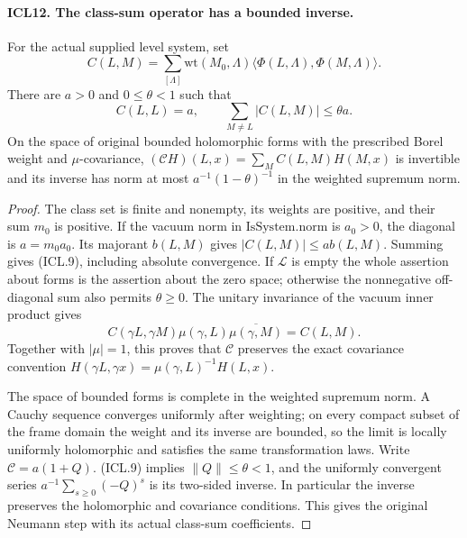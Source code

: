 \documentclass[11pt,a4paper]{article}
\numberwithin{equation}{section}
\theoremstyle{remark}\newtheorem{remark}[theorem]{Remark}
\begin{document}
\paragraph{ICL12. The class-sum operator has a bounded inverse.}
\label{claim:ICL12}
For the actual supplied level system, set
\[
 C(L,M)=\sum_{[\Lambda]}\mathrm{wt}(M_0,\Lambda)
       \langle\Phi(L,\Lambda),\Phi(M,\Lambda)\rangle.
                                                               \tag{ICL.8}
\]
There are \(a>0\) and \(0\leq\theta<1\) such that
\[
 C(L,L)=a,\qquad
 \sum_{M\ne L}|C(L,M)|\leq\theta a.                  \tag{ICL.9}
\]
On the space of original bounded holomorphic forms with
the prescribed Borel weight and \(\mu\)-covariance,
\((\mathcal CH)(L,x)=\sum_M C(L,M)H(M,x)\)
is invertible and its inverse has norm at most
\(a^{-1}(1-\theta)^{-1}\) in the weighted supremum norm.
\begin{proof}
The class set is finite and nonempty, its weights are
positive, and their sum \(m_0\) is positive.  If the
vacuum norm in \(\mathrm{IsSystem.norm}\) is \(a_0>0\),
the diagonal is \(a=m_0a_0\).  Its majorant \(b(L,M)\)
gives \(|C(L,M)|\leq a b(L,M)\).  Summing gives
(ICL.9), including absolute convergence.  If
\(\mathcal L\) is empty the whole assertion about forms
is the assertion about the zero space; otherwise the
nonnegative off-diagonal sum also permits \(\theta\geq0\).
The unitary invariance of the vacuum inner product gives
\[
 C(\gamma L,\gamma M)\mu(\gamma,L)
                \overline{\mu(\gamma,M)}=C(L,M).
\]
Together with \(|\mu|=1\), this proves that
\(\mathcal C\) preserves the exact covariance convention
\(H(\gamma L,\gamma x)=\mu(\gamma,L)^{-1}H(L,x)\).

The space of bounded forms is complete in the weighted
supremum norm.  A Cauchy sequence converges uniformly after
weighting; on every compact subset of the frame domain
the weight and its inverse are bounded, so the limit is
locally uniformly holomorphic and satisfies the same
transformation laws.  Write \(\mathcal C=a(1+Q)\).
(ICL.9) implies \(\|Q\|\leq\theta<1\), and the uniformly
convergent series
\(a^{-1}\sum_{s\geq0}(-Q)^s\) is its two-sided inverse.
In particular the inverse preserves the holomorphic and
covariance conditions.  This gives the original Neumann
step with its actual class-sum coefficients.
\end{proof}

\end{document}
